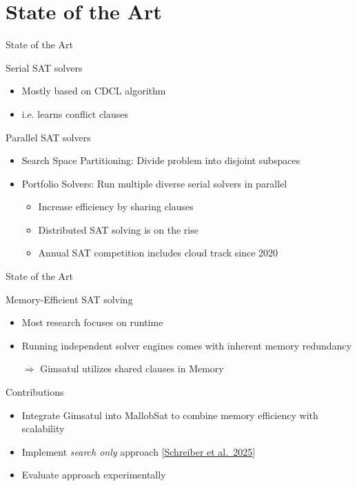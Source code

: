 \documentclass[]{sdqbeamer}
\begin{document}
\section{State of the Art}
\begin{frame}{State of the Art}
    \begin{block}{Serial SAT solvers}
        \begin{itemize}
            \item Mostly based on CDCL algorithm
            \item i.e. learns conflict clauses
        \end{itemize}
    \end{block}

    \begin{block}{Parallel SAT solvers}
        \begin{itemize}
            \item Search Space Partitioning: Divide problem into disjoint subspaces
            \item Portfolio Solvers: Run multiple diverse serial solvers in parallel
            \begin{itemize}
                \item Increase efficiency by sharing clauses
                \item Distributed SAT solving is on the rise
                \item Annual SAT competition includes cloud track since 2020
            \end{itemize}
        \end{itemize}
    \end{block}
\end{frame}

\begin{frame}{State of the Art}
    \begin{block}{Memory-Efficient SAT solving}
        \begin{itemize}
            \item Most research focuses on runtime
            \item Running independent solver engines comes with inherent memory redundancy
            \item[$\Rightarrow$] Gimsatul utilizes shared clauses in Memory
        \end{itemize}
    \end{block}

    \begin{block}{Contributions}
        \begin{itemize}
            \item Integrate Gimsatul into MallobSat to combine memory efficiency with scalability
            \item Implement \textit{search only} approach [\href{https://satres.kikit.kit.edu/papers/2025-sat-streamlining-pre.pdf}{Schreiber et al.~2025}]
            \item Evaluate approach experimentally
        \end{itemize}
    \end{block}
\end{frame}
\end{document}
